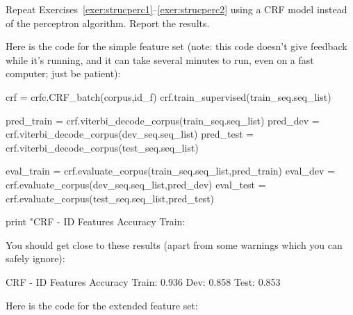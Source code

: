 \begin{exercise}
Repeat Exercises~\ref{exer:strucperc1}--\ref{exer:strucperc2} using a CRF model instead of the perceptron algorithm. 
Report the results. 

Here is the code for the simple feature set (note: this code doesn't give feedback while it's running, and it can take several minutes to run, even on a fast computer; just be patient):

%
%
%
%
%

\begin{python}
crf = crfc.CRF_batch(corpus,id_f)
crf.train_supervised(train_seq.seq_list)

pred_train = crf.viterbi_decode_corpus(train_seq.seq_list)
pred_dev = crf.viterbi_decode_corpus(dev_seq.seq_list)
pred_test = crf.viterbi_decode_corpus(test_seq.seq_list)

eval_train = crf.evaluate_corpus(train_seq.seq_list,pred_train)
eval_dev = crf.evaluate_corpus(dev_seq.seq_list,pred_dev)
eval_test = crf.evaluate_corpus(test_seq.seq_list,pred_test)

print "CRF - ID Features Accuracy Train: %
\end{python}

You should get close to these results (apart from some warnings which you can safely ignore):
\begin{python}
CRF - ID Features Accuracy Train: 0.936 Dev: 0.858 Test: 0.853
\end{python}

Here is the code for the extended feature set:


\end{exercise}
